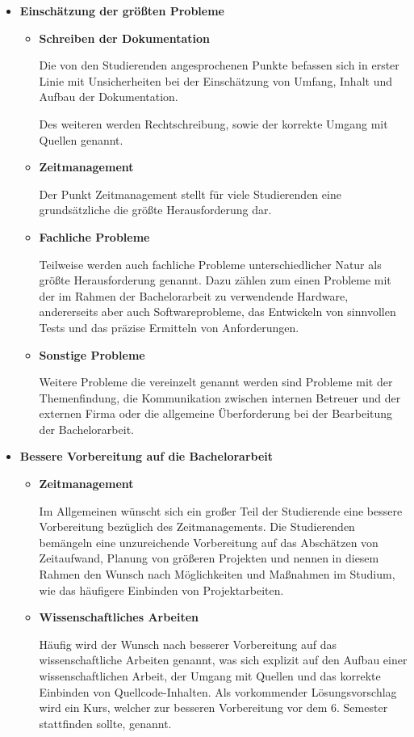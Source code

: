 \documentclass{scrreprt}
\begin{document}
\begin{itemize}
\item \textbf{Einschätzung der größten Probleme}

\begin{itemize}
\item \textbf{Schreiben der Dokumentation}
\par Die von den Studierenden angesprochenen Punkte befassen sich in erster Linie mit Unsicherheiten bei der Einschätzung von Umfang, Inhalt und Aufbau der Dokumentation. 
\par Des weiteren werden Rechtschreibung, sowie der korrekte Umgang mit Quellen genannt.

\item \textbf{Zeitmanagement}
\par Der Punkt Zeitmanagement stellt für viele Studierenden eine grundsätzliche die größte Herausforderung dar.

\item \textbf{Fachliche Probleme}
\par Teilweise werden auch fachliche Probleme unterschiedlicher Natur als größte Herausforderung genannt. Dazu zählen zum einen Probleme mit der im Rahmen der Bachelorarbeit zu verwendende Hardware, andererseits aber auch Softwareprobleme, das Entwickeln von sinnvollen Tests und das präzise Ermitteln von Anforderungen.

\item \textbf{Sonstige Probleme}
\par Weitere Probleme die vereinzelt genannt werden sind Probleme mit der Themenfindung, die Kommunikation zwischen internen Betreuer und der externen Firma oder die allgemeine Überforderung bei der Bearbeitung der Bachelorarbeit.
\end{itemize}

\item \textbf{Bessere Vorbereitung auf die Bachelorarbeit}
\begin{itemize}

\item \textbf{Zeitmanagement}
\par Im Allgemeinen wünscht sich ein großer Teil der Studierende eine bessere Vorbereitung bezüglich des Zeitmanagements. Die Studierenden bemängeln eine unzureichende Vorbereitung auf das Abschätzen von Zeitaufwand, Planung von größeren Projekten und nennen in diesem Rahmen den Wunsch nach Möglichkeiten und Maßnahmen im Studium, wie das häufigere Einbinden von Projektarbeiten.

\item \textbf{Wissenschaftliches Arbeiten}
\par Häufig wird der Wunsch nach besserer Vorbereitung auf das wissenschaftliche Arbeiten genannt, was sich explizit auf den Aufbau einer wissenschaftlichen Arbeit, der Umgang mit Quellen und das korrekte Einbinden von Quellcode-Inhalten. Als vorkommender Lösungsvorschlag wird ein Kurs, welcher zur besseren Vorbereitung vor dem 6. Semester stattfinden sollte, genannt.


\end{itemize}
\end{itemize}
\end{document}

